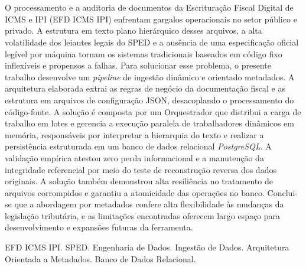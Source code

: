 \section*{}
\noindent O processamento e a auditoria de documentos da Escrituração Fiscal
Digital de ICMS e IPI (EFD ICMS IPI) enfrentam gargalos operacionais no setor
público e privado. A estrutura em texto plano hierárquico desses arquivos, a
alta volatilidade dos leiautes
legais do SPED e a ausência de uma especificação oficial legível por máquina
tornam os sistemas tradicionais baseados em código fixo inflexíveis e
propensos a falhas. Para solucionar esse problema, o presente
trabalho desenvolve um \textit{pipeline} de ingestão dinâmico e orientado 
metadados.
A arquitetura elaborada extrai as regras de negócio da documentação fiscal e
as
estrutura em arquivos de configuração JSON, desacoplando o processamento
do código-fonte. A solução é composta por um Orquestrador que distribui
a carga de trabalho em lotes e gerencia a execução paralela de trabalhadores
dinâmicos em memória, responsáveis por interpretar a hierarquia do texto e
realizar a persistência estruturada em um banco de dados relacional
\textit{PostgreSQL}. A validação empírica atestou zero perda informacional
e a manutenção da integridade referencial por meio do teste de reconstrução
reversa dos dados originais. A solução também demonstrou alta resiliência
no tratamento de arquivos corrompidos e garantiu a atomicidade das operações
no banco. Conclui-se que a abordagem por metadados confere alta flexibilidade
às mudanças da legislação tributária, e as limitações encontradas oferecem
largo espaço para desenvolvimento e expansões futuras da ferramenta.

\vspace{\baselineskip}

 EFD ICMS IPI.
SPED.
Engenharia de Dados.
Ingestão de Dados.
Arquitetura Orientada a Metadados.
Banco de Dados Relacional.